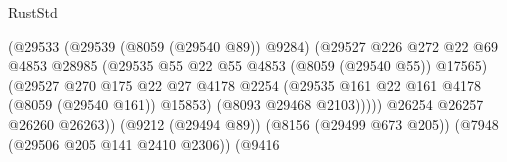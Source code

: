 \begin{lexlean}{RustStd}
\begin{coremodule}
{\begin{coremodule}
{{{{{{{{{{{{{{{{{{{{{{{{{{{{{{{{{{                                                      (@29533
                                                        (@29539 (@8059 (@29540 @89)) @9284)
                                                        (@29527
                                                          @226
                                                          @272
                                                          @22
                                                          @69
                                                          @4853
                                                          @28985
                                                          (@29535
                                                            @55
                                                            @22
                                                            @55
                                                            @4853
                                                            (@8059 (@29540 @55))
                                                            @17565)
                                                          (@29527
                                                            @270
                                                            @175
                                                            @22
                                                            @27
                                                            @4178
                                                            @2254
                                                            (@29535
                                                              @161
                                                              @22
                                                              @161
                                                              @4178
                                                              (@8059 (@29540 @161))
                                                              @15853)
                                                            (@8093 @29468 @2103)))))
                                                    @26254
                                                    @26257
                                                    @26260
                                                    @26263))
                                                (@9212 (@29494 @89))
                                                (@8156 (@29499 @673 @205))
                                                (@7948 (@29506 @205 @141 @2410 @2306))
                                                (@9416
}}}}}}}}}}}}}}}}}}}}}}}}}}}}}}}}}}
\end{coremodule}}
\end{coremodule}
\end{lexlean}
